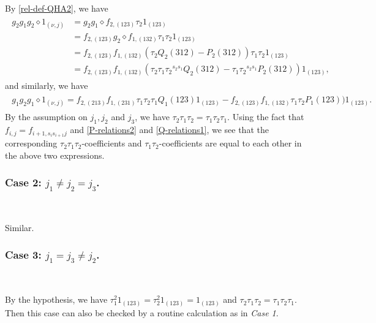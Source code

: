 \documentclass[11pt, reqno]{amsart} \textwidth=14.9cm \oddsidemargin=1cm \evensidemargin=1cm
\theoremstyle{definition}
\numberwithin{equation}{section}
\begin{document}
\vspace{0.35cm}\noindent By \eqref{rel-def-QHA2}, we have
\begin{align*}
\begin{split}
g_{2}g_{1}g_{2}\diamond 1_{(\nu, j)}&=g_{2}g_{1}\diamond f_{2, (123)}\tau_{2}1_{(123)}\\
&=f_{2, (123)}g_{2}\diamond f_{1, (132)}\tau_{1}\tau_{2}1_{(123)}\\
&=f_{2, (123)}f_{1, (132)}(\tau_{2}Q_{2}(312)-P_{2}(312))\tau_{1}\tau_{2}1_{(123)}\\
&=f_{2, (123)}f_{1, (132)}(\tau_{2}\tau_{1}\tau_{2}{}^{s_{2}s_{1}}Q_{2}(312)-\tau_{1}\tau_{2}{}^{s_{2}s_{1}}P_{2}(312))1_{(123)},
\end{split}
\end{align*}
and similarly, we have
\begin{align*}
\begin{split}
g_{1}g_{2}g_{1}\diamond 1_{(\nu, j)}=f_{2, (213)}f_{1, (231)}\tau_{1}\tau_{2}\tau_{1}Q_{1}(123)1_{(123)}-f_{2, (123)}f_{1, (132)}\tau_{1}\tau_{2}P_{1}(123))1_{(123)}.
\end{split}
\end{align*}
By the assumption on $j_1, j_2$ and $j_3$, we have $\tau_{2}\tau_{1}\tau_{2}=\tau_{1}\tau_{2}\tau_{1}.$ Using the fact that $f_{i, j}=f_{i+1, s_{i}s_{i+1}j}$ and \eqref{P-relations2} and \eqref{Q-relations1}, we see that the corresponding $\tau_{2}\tau_{1}\tau_{2}$-coefficients and $\tau_{1}\tau_{2}$-coefficients are equal to each other in the above two expressions.

\subsubsection*{Case 2: $j_1\neq j_2=j_3$.}

\

\vspace{0.3cm}\noindent Similar.

\subsubsection*{Case 3: $j_1=j_3\neq j_2$.}

\

\vspace{0.3cm}\noindent By the hypothesis, we have $\tau_{1}^{2}1_{(123)}=\tau_{2}^{2}1_{(123)}=1_{(123)}$ and $\tau_{2}\tau_{1}\tau_{2}=\tau_{1}\tau_{2}\tau_{1}.$ Then this case can also be checked by a routine calculation as in \emph{Case 1}.
\end{document}
